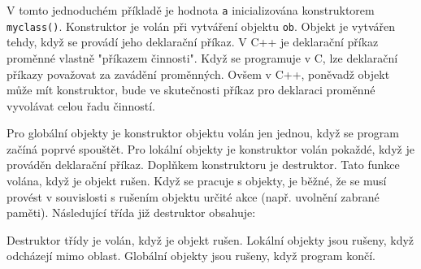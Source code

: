 {      %
      
  
      V tomto jednoduchém příkladě je hodnota \lstinline[basicstyle=\ttfamily]!a! inicializována 
      konstruktorem \lstinline[basicstyle=\ttfamily]!myclass()!. Konstruktor je volán při vytváření 
      objektu \lstinline[basicstyle=\ttfamily]!ob!. Objekt je vytvářen tehdy, když se provádí jeho 
      deklarační příkaz. V C++ je deklarační příkaz proměnné vlastně "příkazem činnosti". Když se 
      programuje v C, lze deklarační příkazy považovat za zavádění proměnných. Ovšem v C++, 
      poněvadž objekt může mít konstruktor, bude ve skutečnosti příkaz pro deklaraci proměnné 
      vyvolávat celou řadu činností.
  
      Pro globální objekty je konstruktor objektu volán jen jednou, když se program začíná poprvé 
      spouštět. Pro lokální objekty je konstruktor volán pokaždé, když je prováděn deklarační 
      příkaz. Doplňkem konstruktoru je destruktor. Tato funkce volána, když je objekt rušen. Když 
      se pracuje s objekty, je běžné, že se musí provést v souvislosti s rušením objektu určité 
      akce (např. uvolnění zabrané paměti). Následující třída již destruktor obsahuje:
      
  
      Destruktor třídy je volán, když je objekt rušen. Lokální objekty jsou rušeny, když odcházejí 
      mimo oblast. Globální objekty jsou rušeny, když program končí.
  
}
